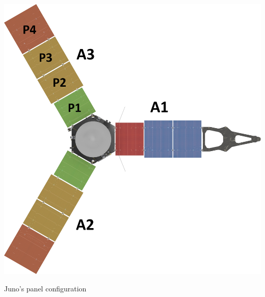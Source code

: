 \begin{minipage}{0.4\linewidth}
    \centering
    \captionsetup{type=figure}
    \includegraphics[width=\linewidth]{Images/Juno panels.jpg}
    \caption{Juno's panel configuration}
    \label{fig:panel_config}
\end{minipage}\hfill
